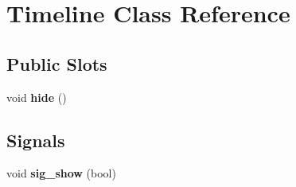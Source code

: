 \hypertarget{class_timeline}{\section{\-Timeline \-Class \-Reference}
\label{class_timeline}
}
\subsection*{\-Public \-Slots}
\begin{DoxyCompactItemize}
\item 
\hypertarget{class_timeline_a0af9ee4fc6343347cbffc1ccdea5b6b5}{void {\bfseries hide} ()}\label{class_timeline_a0af9ee4fc6343347cbffc1ccdea5b6b5}

\end{DoxyCompactItemize}
\subsection*{\-Signals}
\begin{DoxyCompactItemize}
\item 
\hypertarget{class_timeline_a46f6817048e17627fbb08e78b2d94828}{void {\bfseries sig\-\_\-show} (bool)}\label{class_timeline_a46f6817048e17627fbb08e78b2d94828}

\end{DoxyCompactItemize}
